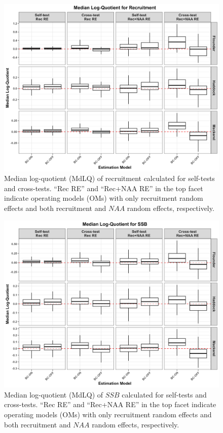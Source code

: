 \documentclass[
  12pt,
]{article}
\begin{document}
\begin{figure}[H]
    \centering
    \includegraphics[width=\textwidth]{Revised_Figures&Tables/MdLQ_Rec.PNG}
    \caption{Median log-quotient (MdLQ) of recruitment calculated for self-tests and cross-tests. ``Rec RE'' and ``Rec+NAA RE'' in the top facet indicate operating models (OMs) with only recruitment random effects and both recruitment and $NAA$ random effects, respectively.}
    \label{fig:supp_Rec_MdLQ}
\end{figure}

\begin{figure}[H]
    \centering
    \includegraphics[width=\textwidth]{Revised_Figures&Tables/MdLQ_SSB.PNG}
    \caption{Median log-quotient (MdLQ) of $SSB$ calculated for self-tests and cross-tests. ``Rec RE'' and ``Rec+NAA RE'' in the top facet indicate operating models (OMs) with only recruitment random effects and both recruitment and $NAA$ random effects, respectively.}
    \label{fig:supp_SSB_MdLQ}
\end{figure}
\end{document}

